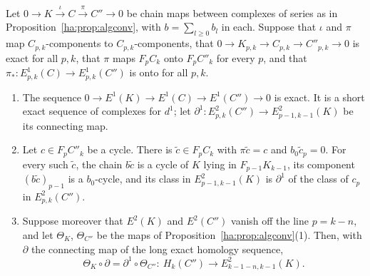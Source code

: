 \begin{lemma}\label{ha:lem:connlead}
Let \(0\to K\xrightarrow{\iota}C\xrightarrow{\pi}C''\to0\) be chain maps
between complexes of series as in Proposition~\ref{ha:prop:algconv}, with
\(b=\sum_{l\ge0}b_l\) in each. Suppose that \(\iota\) and \(\pi\) map
\(C_{p,k}\)-components to \(C_{p,k}\)-components, that
\(0\to K_{p,k}\to C_{p,k}\to C''_{p,k}\to0\) is exact for all \(p,k\), that
\(\pi\) maps \(F_pC_k\) onto \(F_pC''_k\) for every \(p\), and that
\(\pi_*:E^1_{p,k}(C)\to E^1_{p,k}(C'')\) is onto for all \(p,k\).
\begin{enumerate}
\item The sequence \(0\to E^1(K)\to E^1(C)\to E^1(C'')\to0\) is exact.
It is a short exact sequence of complexes for \(d^1\); let
\(\partial^1:E^2_{p,k}(C'')\to E^2_{p-1,k-1}(K)\) be its connecting map.
\item Let \(c\in F_pC''_k\) be a cycle. There is \(\tilde c\in F_pC_k\) with
\(\pi\tilde c=c\) and \(b_0\tilde c_p=0\). For every such \(\tilde c\),
the chain \(b\tilde c\) is a cycle of \(K\) lying in \(F_{p-1}K_{k-1}\),
its component \((b\tilde c)_{p-1}\) is a \(b_0\)-cycle, and its class in
\(E^2_{p-1,k-1}(K)\) is \(\partial^1\) of the class of \(c_p\) in
\(E^2_{p,k}(C'')\).
\item Suppose moreover that \(E^2(K)\) and \(E^2(C'')\) vanish off the
line \(p=k-n\), and let \(\Theta_K\), \(\Theta_{C''}\) be the maps of
Proposition~\ref{ha:prop:algconv}(1). Then, with \(\partial\) the
connecting map of the long exact homology sequence,
\[
 \Theta_K\circ\partial=\partial^1\circ\Theta_{C''}:\ H_k(C'')\to
 E^2_{k-1-n,k-1}(K).
\]
\end{enumerate}
\end{lemma}

